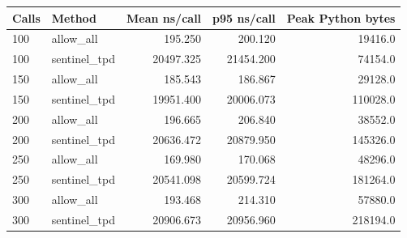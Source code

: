 \begin{tabular}{llrrr}
Calls & Method & Mean ns/call & p95 ns/call & Peak Python bytes \\
\hline
100 & allow\_all & 195.250 & 200.120 & 19416.0 \\
100 & sentinel\_tpd & 20497.325 & 21454.200 & 74154.0 \\
150 & allow\_all & 185.543 & 186.867 & 29128.0 \\
150 & sentinel\_tpd & 19951.400 & 20006.073 & 110028.0 \\
200 & allow\_all & 196.665 & 206.840 & 38552.0 \\
200 & sentinel\_tpd & 20636.472 & 20879.950 & 145326.0 \\
250 & allow\_all & 169.980 & 170.068 & 48296.0 \\
250 & sentinel\_tpd & 20541.098 & 20599.724 & 181264.0 \\
300 & allow\_all & 193.468 & 214.310 & 57880.0 \\
300 & sentinel\_tpd & 20906.673 & 20956.960 & 218194.0 \\
\end{tabular}
